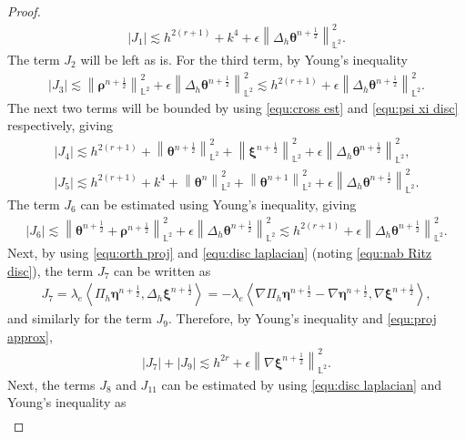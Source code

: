 \documentclass[11pt, reqno]{amsart}
\theoremstyle{definition}
\theoremstyle{remark}
\numberwithin{equation}{section}
\newcommand{\bff}{\boldsymbol}
\newcommand{\bb}{\mathbb}
\newcommand{\norm}[2]{\left\|{#1}\right\|_{#2}}
\newcommand{\inpro}[2]{\left\langle#1,#2\right\rangle}
\newcommand{\abs}[1]{\left|{#1}\right|}
\begin{document}
\begin{proof}
\begin{align*}
	\abs{J_1} \lesssim h^{2(r+1)}+k^4+ \epsilon \norm{\Delta_h \bff{\theta}^{n+\frac{1}{2}}}{\bb{L}^2}^2.
\end{align*}
The term $J_2$ will be left as is. For the third term, by Young's inequality
\begin{align*}
	\abs{J_3} \lesssim \norm{\bff{\rho}^{n+\frac{1}{2}}}{\bb{L}^2}^2 + \epsilon \norm{\Delta_h \bff{\theta}^{n+\frac{1}{2}}}{\bb{L}^2}^2
	\lesssim
	h^{2(r+1)}+ \epsilon \norm{\Delta_h \bff{\theta}^{n+\frac{1}{2}}}{\bb{L}^2}^2.
\end{align*}
The next two terms will be bounded by using \eqref{equ:cross est} and \eqref{equ:psi xi disc} respectively, giving
\begin{align*}
	\abs{J_4}
	\lesssim
	h^{2(r+1)} + \norm{\bff{\theta}^{n+\frac{1}{2}}}{\bb{L}^2}^2 + \norm{\bff{\xi}^{n+\frac{1}{2}}}{\bb{L}^2}^2
	+ \epsilon \norm{\Delta_h \bff{\theta}^{n+\frac{1}{2}}}{\bb{L}^2}^2,
	\\
	\abs{J_5}
	\lesssim
	h^{2(r+1)} + k^4 + \norm{\bff{\theta}^n}{\bb{L}^2}^2 + \norm{\bff{\theta}^{n+1}}{\bb{L}^2}^2 
	+ \epsilon \norm{\Delta_h \bff{\theta}^{n+\frac{1}{2}}}{\bb{L}^2}^2.
\end{align*}
The term $J_6$ can be estimated using Young's inequality, giving
\begin{align*}
	\abs{J_6}
	\lesssim
	\norm{\bff{\theta}^{n+\frac12}+\bff{\rho}^{n+\frac12}}{\bb{L}^2}^2
	+
	\epsilon \norm{\Delta_h \bff{\theta}^{n+\frac{1}{2}}}{\bb{L}^2}^2
	\lesssim
	h^{2(r+1)} 
	+
	\epsilon \norm{\Delta_h \bff{\theta}^{n+\frac{1}{2}}}{\bb{L}^2}^2.
\end{align*}
Next, by using \eqref{equ:orth proj} and \eqref{equ:disc laplacian} (noting \eqref{equ:nab Ritz disc}), the term $J_7$ can be written as
\begin{align*}
	J_7= \lambda_e \inpro{\Pi_h \bff{\eta}^{n+\frac{1}{2}}}{\Delta_h \bff{\xi}^{n+\frac{1}{2}}}
	=
	-\lambda_e \inpro{\nabla \Pi_h \bff{\eta}^{n+\frac{1}{2}}-\nabla \bff{\eta}^{n+\frac{1}{2}}}{\nabla \bff{\xi}^{n+\frac{1}{2}}},
\end{align*}
and similarly for the term $J_9$.
Therefore, by Young's inequality and \eqref{equ:proj approx},
\begin{align*}
	\abs{J_7}+\abs{J_9} 
	\lesssim 
	h^{2r}+ \epsilon \norm{\nabla \bff{\xi}^{n+\frac{1}{2}}}{\bb{L}^2}^2.
\end{align*}
Next, the terms $J_8$ and $J_{11}$ can be estimated by using \eqref{equ:disc laplacian} and Young's inequality as
\begin{align*}

\end{align*}
\end{proof}
\end{document}
